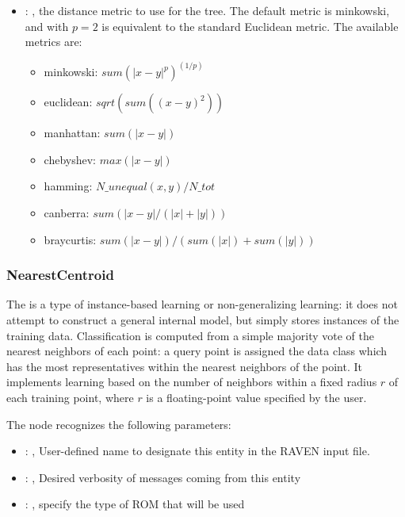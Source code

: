 \begin{itemize}
    \item {}: , 
      the distance metric to use for the tree. The default metric is minkowski, and with
      $p=2$ is equivalent to the standard Euclidean metric.
      The available metrics are:                                                  \begin{itemize}
      \item minkowski: $sum(|x - y|^p)^(1/p)$
      \item euclidean: $sqrt(sum((x - y)^2))$
      \item manhattan: $sum(|x - y|)$                                                    \item
      chebyshev: $max(|x - y|)$                                                    \item hamming:
      $N\_unequal(x, y) / N\_tot$                                                    \item canberra:
      $sum(|x - y| / (|x| + |y|))$                                                    \item
      braycurtis: $sum(|x - y|) / (sum(|x|) + sum(|y|))$
      \end{itemize}
  \end{itemize}


\subsubsection{NearestCentroid}
  The  is a type of instance-based learning or
  non-generalizing learning: it does not attempt to construct a general internal
  model, but simply stores instances of the training data.                          Classification
  is computed from a simple majority vote of the nearest neighbors                          of each
  point: a query point is assigned the data class which has the most
  representatives within the nearest neighbors of the point.                          It implements
  learning based on the number of neighbors within a fixed radius                          $r$ of
  each training point, where $r$ is a floating-point value specified by the
  user.                          

  The  node recognizes the following parameters:
    \begin{itemize}
      \item {}: , 
        User-defined name to designate this entity in the RAVEN input file.
      \item {}: , 
        Desired verbosity of messages coming from this entity
      \item {}: , 
        specify the type of ROM that will be used
  \end{itemize}

